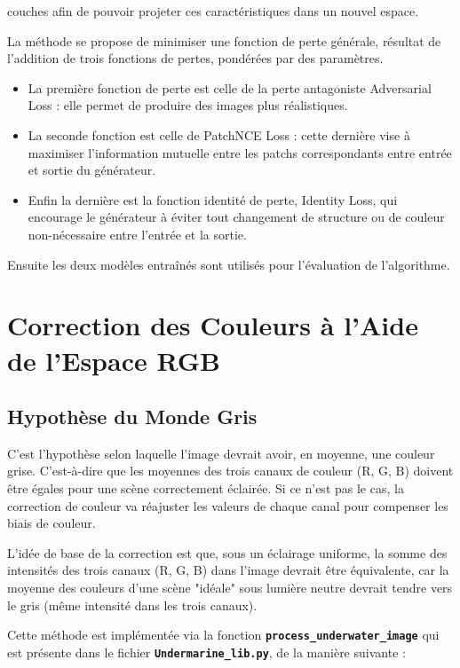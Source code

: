 \documentclass[10pt, a4paper]{extarticle}
\numberwithin{equation}{section}
\numberwithin{figure}{section}
\begin{document}
\begin{itemize}
couches afin de pouvoir projeter ces caractéristiques dans un nouvel espace.
\vspace{2mm}
\par La méthode se propose de minimiser une fonction de perte générale, résultat de l’addition de trois
fonctions de pertes, pondérées par des paramètres.
\begin{itemize}
\item La première fonction de perte est celle de la perte antagoniste Adversarial Loss : elle permet de produire des images plus réalistiques.
\item La seconde fonction est celle de PatchNCE Loss : cette dernière vise à maximiser l’information mutuelle entre les patchs correspondants entre entrée et sortie du générateur.
\item Enfin la dernière est la fonction identité de perte, Identity Loss, qui encourage le générateur à éviter
tout changement de structure ou de couleur non-nécessaire entre l’entrée et la sortie.
\end{itemize}
\vspace{2mm}
Ensuite les deux modèles entraînés sont utilisés pour l’évaluation de l’algorithme.
\end{itemize}

\section{Correction des Couleurs à l'Aide de l'Espace RGB}

\subsection{Hypothèse du Monde Gris}
\par C'est l'hypothèse selon laquelle l'image devrait avoir, en moyenne, une couleur grise. C'est-à-dire que les moyennes des trois canaux de couleur (R, G, B) doivent être égales pour une scène correctement éclairée. Si ce n'est pas le cas, la correction de couleur va réajuster les valeurs de chaque canal pour compenser les biais de couleur.
\vspace{2mm}
\par L'idée de base de la correction est que, sous un éclairage uniforme, la somme des intensités des trois canaux (R, G, B) dans l'image devrait être équivalente, car la moyenne des couleurs d'une scène "idéale" sous lumière neutre devrait tendre vers le gris (même intensité dans les trois canaux).
\vspace{2mm}
\par Cette méthode est implémentée via la fonction \colorbox{gray!15}{\texttt{\textbf{process\_underwater\_image}}} qui est présente dans le fichier \colorbox{gray!15}{\texttt{\textbf{Undermarine\_lib.py}}}, de la manière suivante :
\end{document}
